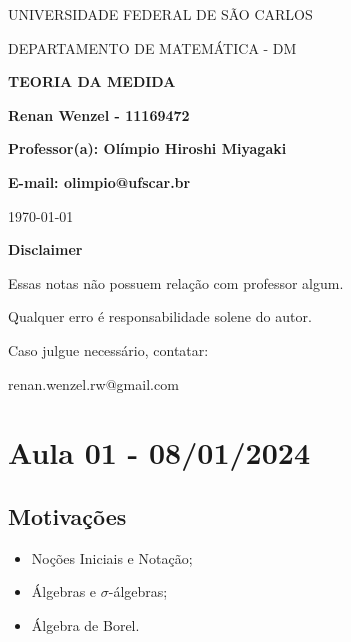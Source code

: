 \documentclass{article}
\begin{document}
\begin{center}
	\vspace{1cm}
	\LARGE
	UNIVERSIDADE FEDERAL DE S\~AO CARLOS

	\vspace{1.3cm}
	\LARGE
	DEPARTAMENTO DE MATEMÁTICA - DM

	\vspace{1.7cm}
	\Large
	\textbf{TEORIA DA MEDIDA}

	\vspace{1.3cm}
	\large
	\textbf{Renan Wenzel - 11169472}

	\vspace{1.3cm}
	\large
	\textbf{Professor(a): Olímpio Hiroshi Miyagaki}

	\textbf{E-mail: olimpio@ufscar.br}

	\vspace{1.3cm}
	\today
\end{center}

\newpage
\textbf{{\Huge Disclaimer}}
\vspace{5cm}

{\huge Essas notas não possuem relação com professor algum.

	Qualquer erro é responsabilidade solene do autor.

	Caso julgue necessário, contatar:

	renan.wenzel.rw@gmail.com}
\tableofcontents

\newpage



\newpage

\section{Aula 01 - 08/01/2024}
\subsection{Motivações}
\begin{itemize}
	\item Noções Iniciais e Notação;
	\item Álgebras e \(\sigma \)-álgebras;
	\item Álgebra de Borel.
\end{itemize}
\end{document}
